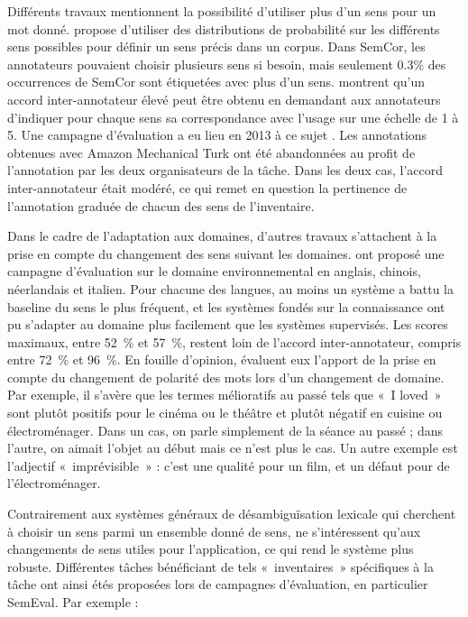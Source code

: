 Différents travaux mentionnent la possibilité d'utiliser plus d'un sens pour un
mot donné. \cite{smith2011rumble} propose d'utiliser des distributions de
probabilité sur les différents sens possibles pour définir un sens précis dans
un corpus. Dans SemCor, les annotateurs pouvaient choisir plusieurs sens si
besoin, mais seulement 0.3\% des occurrences de SemCor sont étiquetées avec
plus d'un sens. \cite{erk2013measuring} montrent qu'un accord inter-annotateur
élevé peut être obtenu en demandant aux annotateurs d'indiquer pour chaque sens
sa correspondance avec l'usage sur une échelle de 1 à 5. Une campagne
d'évaluation a eu lieu en 2013 à ce sujet \citep{jurgens2013semeval}. Les
annotations obtenues avec Amazon Mechanical Turk ont été abandonnées au profit
de l'annotation par les deux organisateurs de la tâche. Dans les deux cas,
l'accord inter-annotateur était modéré, ce qui remet en question la pertinence
de l'annotation graduée de chacun des sens de l'inventaire.

Dans le cadre de l'adaptation aux domaines, d'autres travaux s'attachent à la
prise en compte du changement des sens suivant les domaines.
\cite{agirre2010semeval17} ont proposé une campagne d'évaluation sur le domaine
environnemental en anglais, chinois, néerlandais et italien. Pour chacune des
langues, au moins un système a battu la baseline du sens le plus fréquent, et
les systèmes fondés sur la connaissance ont pu s'adapter au domaine plus
facilement que les systèmes supervisés. Les scores maximaux, entre 52~\% et
57~\%, restent loin de l'accord inter-annotateur, compris entre 72~\% et 96~\%.
En fouille d'opinion, \cite{marchand2014influence} évaluent eux l'apport de la
prise en compte du changement de polarité des mots lors d'un changement de
domaine. Par exemple, il s'avère que les termes mélioratifs au passé tels que
«~I loved~» sont plutôt positifs pour le cinéma ou le théâtre et plutôt négatif
en cuisine ou électroménager. Dans un cas, on parle simplement de la séance au
passé ; dans l'autre, on aimait l'objet au début mais ce n'est plus le cas. Un
autre exemple est l'adjectif «~imprévisible~» : c'est une qualité pour un film,
et un défaut pour de l'électroménager.

Contrairement aux systèmes généraux de désambiguïsation lexicale qui cherchent
à choisir un sens parmi un ensemble donné de sens, \cite{marchand2014influence}
ne s'intéressent qu'aux changements de sens utiles pour l'application, ce qui
rend le système plus robuste. Différentes tâches bénéficiant de tels
«~inventaires~» spécifiques à la tâche ont ainsi étés proposées lors de
campagnes d'évaluation, en particulier SemEval. Par exemple :

